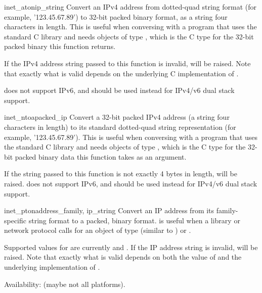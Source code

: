 \begin{funcdesc}{inet_aton}{ip_string}
Convert an IPv4 address from dotted-quad string format (for example,
'123.45.67.89') to 32-bit packed binary format, as a string four
characters in length.  This is useful when conversing with a program
that uses the standard C library and needs objects of type
, which is the C type for the 32-bit packed
binary this function returns.

If the IPv4 address string passed to this function is invalid,
 will be raised. Note that exactly what is
valid depends on the underlying C implementation of
.

 does not support IPv6, and
 should be used instead for IPv4/v6 dual stack
support.
\end{funcdesc}

\begin{funcdesc}{inet_ntoa}{packed_ip}
Convert a 32-bit packed IPv4 address (a string four characters in
length) to its standard dotted-quad string representation (for
example, '123.45.67.89').  This is useful when conversing with a
program that uses the standard C library and needs objects of type
, which is the C type for the 32-bit packed
binary data this function takes as an argument.

If the string passed to this function is not exactly 4 bytes in
length,  will be raised.
 does not support IPv6, and
 should be used instead for IPv4/v6 dual stack
support.
\end{funcdesc}

\begin{funcdesc}{inet_pton}{address_family, ip_string}
Convert an IP address from its family-specific string format to a packed,
binary format.
 is useful when a library or network protocol calls for
an object of type  (similar to )
or .

Supported values for  are currently
 and .
If the IP address string  is invalid,
 will be raised. Note that exactly what is valid
depends on both the value of  and the underlying
implementation of .

Availability: \UNIX{} (maybe not all platforms).
\end{funcdesc}

